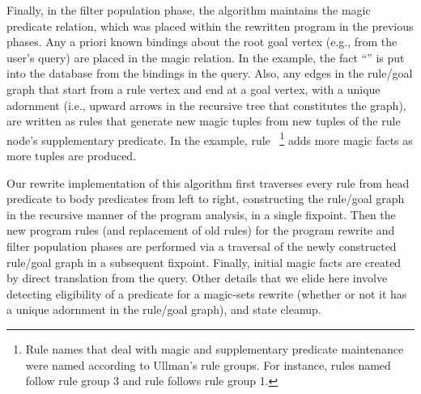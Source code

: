 Finally, in the filter population phase, the algorithm maintains the
magic predicate relation, which was placed within the rewritten program
in the previous phases.  Any a priori known bindings about the root goal vertex
(e.g., from the user's query) are placed in the magic relation. In the example, the 
fact ``'' is put into the
database from the bindings in the  query.  Also, any edges in
the rule/goal graph that start from a rule vertex and end at a goal vertex, with a
unique adornment (i.e., upward arrows in the recursive tree that constitutes the graph), are written as
rules that generate new magic tuples from new tuples of the rule
node's supplementary predicate. In the example, rule ~\footnote{Rule names that
deal with magic and supplementary predicate maintenance were named according
to Ullman's rule groups. For instance, rules named  follow rule group 3
and rule  follows rule group 1.}  adds
more magic facts as more  tuples are produced.

Our rewrite implementation of this algorithm first traverses every rule from
head predicate to body predicates from left to right, constructing the
rule/goal graph in the recursive manner of the program analysis, in a single
fixpoint.  Then the new program rules (and replacement of old rules) for the
program rewrite and filter population phases are performed via a traversal of
the newly constructed rule/goal graph in a subsequent fixpoint.  Finally,
initial magic facts are created by direct translation from the query.  Other
details that we elide here involve detecting eligibility of a predicate for a
magic-sets rewrite (whether or not it has a unique adornment in the rule/goal
graph), and state cleanup.

